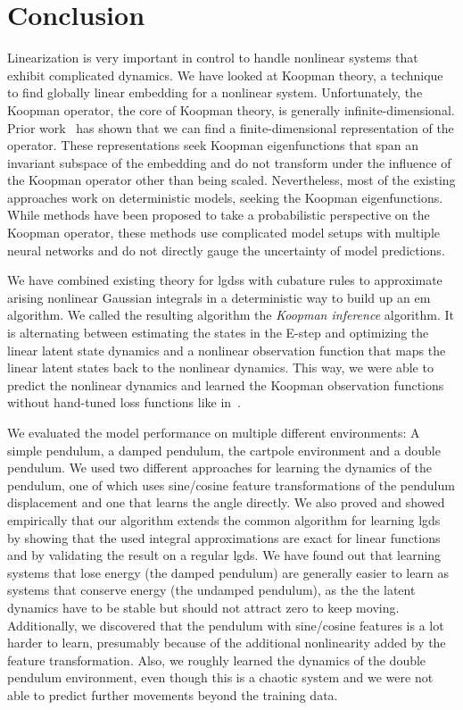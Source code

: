 \chapter{Conclusion}
\label{c:conclusion}



Linearization is very important in control to handle nonlinear systems that exhibit complicated dynamics. We have looked at Koopman theory, a technique to find globally linear embedding for a nonlinear system. Unfortunately, the Koopman operator, the core of Koopman theory, is generally infinite-dimensional. Prior work~\cite{bruntonKoopmanInvariantSubspaces2016,kaiserDatadrivenDiscoveryKoopman2020,luschDeepLearningUniversal2018} has shown that we can find a finite-dimensional representation of the operator. These representations seek Koopman eigenfunctions that span an invariant subspace of the embedding and do not transform under the influence of the Koopman operator other than being scaled. Nevertheless, most of the existing approaches work on deterministic models, seeking the Koopman eigenfunctions. While methods have been proposed to take a probabilistic perspective on the Koopman operator, these methods use complicated model setups with multiple neural networks and do not directly gauge the uncertainty of model predictions.

We have combined existing theory for \aclp{lgds} with cubature rules to approximate arising nonlinear Gaussian integrals in a deterministic way to build up an \acl{em} algorithm. We called the resulting algorithm the \emph{Koopman inference} algorithm. It is alternating between estimating the states in the E-step and optimizing the linear latent state dynamics and a nonlinear observation function that maps the linear latent states back to the nonlinear dynamics. This way, we were able to predict the nonlinear dynamics and learned the Koopman observation functions without hand-tuned loss functions like in~\cite{luschDeepLearningUniversal2018}.

We evaluated the model performance on multiple different environments: A simple pendulum, a damped pendulum, the cartpole environment and a double pendulum. We used two different approaches for learning the dynamics of the pendulum, one of which uses sine/cosine feature transformations of the pendulum displacement and one that learns the angle directly. We also proved and showed empirically that our algorithm extends the common algorithm for learning \ac{lgds} by showing that the used  integral approximations are exact for linear functions and by validating the result on a regular \ac{lgds}. We have found out that learning systems that lose energy (\eg the damped pendulum) are generally easier to learn as systems that conserve energy (\eg the undamped pendulum), as the the latent dynamics have to be stable but should not attract zero to keep moving. Additionally, we discovered that the pendulum with sine/cosine features is a lot harder to learn, presumably because of the additional nonlinearity added by the feature transformation. Also, we roughly learned the dynamics of the double pendulum environment, even though this is a chaotic system and we were not able to predict further movements beyond the training data.

